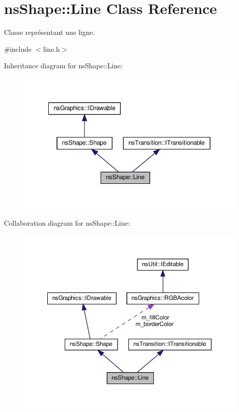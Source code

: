 \hypertarget{classns_shape_1_1_line}{}\section{ns\+Shape\+:\+:Line Class Reference}
\label{classns_shape_1_1_line}


Classe représentant une ligne.  




{\ttfamily \#include $<$line.\+h$>$}



Inheritance diagram for ns\+Shape\+:\+:Line\+:
\nopagebreak
\begin{figure}[H]
\begin{center}
\leavevmode
\includegraphics[width=341pt]{classns_shape_1_1_line__inherit__graph}
\end{center}
\end{figure}


Collaboration diagram for ns\+Shape\+:\+:Line\+:
\nopagebreak
\begin{figure}[H]
\begin{center}
\leavevmode
\includegraphics[width=350pt]{classns_shape_1_1_line__coll__graph}
\end{center}
\end{figure}
